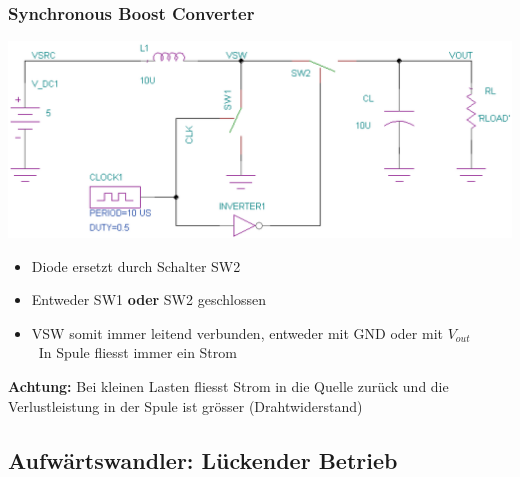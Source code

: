 \subsubsection{Synchronous Boost Converter}

\begin{minipage}{0.4\columnwidth}
    \includegraphics[width=\columnwidth]{images/synchronous_boost_converter.png}
\end{minipage}
\hfill
\begin{minipage}{0.58\columnwidth}
    \begin{itemize}
        \item Diode ersetzt durch Schalter SW2
        \item Entweder SW1 \textbf{oder} SW2 geschlossen
        \item VSW somit immer leitend verbunden, entweder mit GND oder mit $V_{out}$ \\
            \textrightarrow\ In Spule fliesst immer ein Strom
    \end{itemize}
\end{minipage}

\textbf{Achtung:} Bei kleinen Lasten fliesst Strom in die Quelle zurück und die Verlustleistung in der Spule ist grösser (Drahtwiderstand)


\subsection{Aufwärtswandler: Lückender Betrieb}

